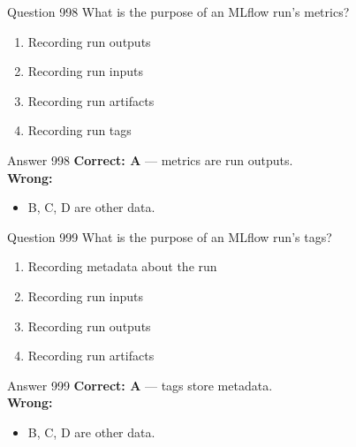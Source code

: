 \documentclass[aspectratio=169,11pt]{beamer}
\begin{document}
	\begin{frame}{Question 998}
		What is the purpose of an MLflow run's metrics?
		\begin{enumerate}[label=\Alph*.]
			\item Recording run outputs
			\item Recording run inputs
			\item Recording run artifacts
			\item Recording run tags
		\end{enumerate}
	\end{frame}
	\begin{frame}{Answer 998}
		\textbf{Correct: A} --- metrics are run outputs.\\
		\vspace{0.5em}
		\textbf{Wrong:}
		\begin{itemize}
			\item B, C, D are other data.
		\end{itemize}
	\end{frame}
	
	\begin{frame}{Question 999}
		What is the purpose of an MLflow run's tags?
		\begin{enumerate}[label=\Alph*.]
			\item Recording metadata about the run
			\item Recording run inputs
			\item Recording run outputs
			\item Recording run artifacts
		\end{enumerate}
	\end{frame}
	\begin{frame}{Answer 999}
		\textbf{Correct: A} --- tags store metadata.\\
		\vspace{0.5em}
		\textbf{Wrong:}
		\begin{itemize}
			\item B, C, D are other data.
		\end{itemize}
	\end{frame}
	
\end{document}

